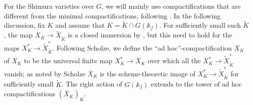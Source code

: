 \documentclass{amsart}
\theoremstyle{remark}
\numberwithin{equation}{subsection}
\newcommand{\A}{\AA}
\renewcommand{\AA}{{\mathbb A}}
\newcommand{\tK}{{\widetilde{K}}}
\newcommand{\ol}{\overline}
\newcommand{\wt}{\widetilde}
\renewcommand{\(}{\left(}
\renewcommand{\)}{\right)}
\begin{document}
\medskip

For the Shimura varieties over $G$, we will mainly use compactifications that are different from the minimal compactifications, following \cite[\S 4.1]{scholze-galois}. In the following discussion, fix $K$ and assume that $K = \tK \cap G(\A_f)$. For sufficiently small such $\tK$, the map $X_K \to \wt{X}_{\tK}$ is a closed immersion by \cite[Proposition 1.15]{deligne-tshimura}, but this need to hold for the maps $X_K^\ast \to \wt{X}_{\tK}^\ast$. Following Scholze, we define the ``ad hoc''-compactification $\ol{X}_K$ of $X_K$ to be the universal finite map $X_K^\ast \to \ol{X}_K$ over which all the 
$X_K^\ast \to \wt{X}_{\tK}^\ast$ vanish; as noted by Scholze $\ol{X}_K$ is the scheme-theoretic image of $X_K^\ast \to \wt{X}_{\tK}^\ast$ for sufficiently small $\tK$. The right action of $G(\A_f)$ extends to the tower of ad hoc compactifications $(\ol{X}_K)_K$.
\end{document}
